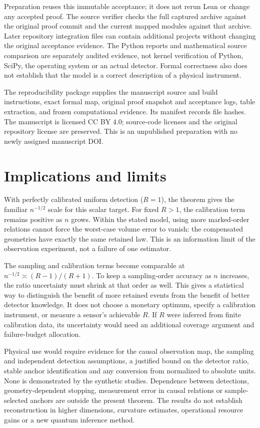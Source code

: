 \documentclass[11pt]{article}
\theoremstyle{remark}
\begin{document}
Preparation reuses this immutable acceptance; it does not rerun Lean or
change any accepted proof. The source verifier checks the full captured
archive against the original proof commit and the current mapped modules
against that archive. Later repository integration files can contain
additional projects without changing the original acceptance evidence.
The Python reports and mathematical source comparison are separately
audited evidence, not kernel verification of Python, SciPy, the operating
system or an actual detector. Formal correctness also does not establish
that the model is a correct description of a physical instrument.

The reproducibility package supplies the manuscript source and build
instructions, exact formal map, original proof snapshot and acceptance
logs, table extraction, and frozen computational evidence. Its manifest
records file hashes. The manuscript is licensed CC BY 4.0; source-code
licenses and the original repository license are preserved. This is an
unpublished preparation with no newly assigned manuscript DOI.

\section{Implications and limits}\label{sec:implications}
With perfectly calibrated uniform detection ($R=1$), the theorem gives
the familiar $n^{-1/2}$ scale for this scalar target. For fixed $R>1$,
the calibration term remains positive as $n$ grows. Within the stated
model, using more marked-order relations cannot force the worst-case
volume error to vanish: the compensated geometries have exactly the same
retained law. This is an information limit of the observation experiment,
not a failure of one estimator.

The sampling and calibration terms become comparable at
$n^{-1/2}\asymp(R-1)/(R+1)$. To keep a sampling-order accuracy as $n$
increases, the ratio uncertainty must shrink at that order as well.
This gives a statistical way to distinguish the benefit of more retained
events from the benefit of better detector knowledge. It does not choose
a monetary optimum, specify a calibration instrument, or measure a
sensor's achievable $R$. If $R$ were inferred from finite calibration
data, its uncertainty would need an additional coverage argument and
failure-budget allocation.

Physical use would require evidence for the causal observation map,
the sampling and independent detection assumptions, a justified bound on
the detector ratio, stable anchor identification and any conversion from
normalized to absolute units. None is demonstrated by the synthetic
studies. Dependence between detections, geometry-dependent stopping,
measurement error in causal relations or sample-selected anchors are
outside the present theorem. The results do not establish reconstruction
in higher dimensions, curvature estimates, operational resource gains or
a new quantum inference method.
\end{document}
